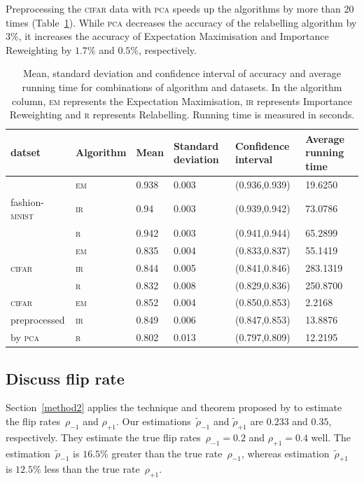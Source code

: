 \documentclass[12pt]{article} %
\newcommand{\rhoo}{\rho_{+1}}
\newcommand{\rhoz}{\rho_{-1}}
\newcommand{\mnist}{fashion-\textsc{mnist}}
\begin{document}
Preprocessing the \textsc{cifar} data with \textsc{pca} speeds up the algorithms by more than 20 times (Table~\ref{tab:Meansd}). While  \textsc{pca} decreases the accuracy of the relabelling algorithm by $3\%$, it increases the accuracy of Expectation Maximisation and Importance Reweighting  by $1.7\%$ and $0.5\%$, respectively. 
\begin{table}
	\caption{Mean, standard deviation and confidence interval of accuracy and average running time for combinations of algorithm and datasets. In the algorithm column, \textsc{em} represents the Expectation Maximisation, \textsc{ir} represents Importance Reweighting and \textsc{r} represents Relabelling. Running time is measured in seconds.}
	\label{tab:Meansd}
\centering
\begin{tabular}{@{}llllll@{}}
\toprule
datset& Algorithm&Mean  & Standard deviation & Confidence interval & Average running time \\ \midrule
&\textsc{em}&0.938 & 0.003              & (0.936,0.939)     & 19.6250\\
\mnist\ &\textsc{ir}&0.94  & 0.003              & (0.939,0.942)     & 73.0786\\
&\textsc{r}&0.942 & 0.003              & (0.941,0.944)     & 65.2899\\
\midrule
&\textsc{em}&0.835 & 0.004              & (0.833,0.837)     & 55.1419\\
\textsc{cifar}&\textsc{ir}&0.844 & 0.005              & (0.841,0.846)     & 283.1319\\
  &\textsc{r}&0.832 & 0.008              & (0.829,0.836)     & 250.8700\\ 
\midrule
\textsc{cifar}&\textsc{em}&0.852 & 0.004              & (0.850,0.853)     & 2.2168\\
 preprocessed&\textsc{ir}& 0.849 & 0.006              & (0.847,0.853)     & 13.8876\\
 by \textsc{pca}  &\textsc{r}& 0.802 & 0.013              & (0.797,0.809)     & 12.2195\\ 
\bottomrule
\end{tabular}
\end{table}



\subsection{Discuss flip rate}

Section~\ref{method2} applies the technique and theorem proposed by \citet{liu2016classification} to estimate the flip rates~$\rhoz$ and $\rhoo$. Our estimations~$\tilde{\rho}_{-1}$ and $\tilde{\rho}_{+1}$ are $0.233$ and $0.35$, respectively. They estimate the true flip rates~$\rhoz=0.2$ and $\rhoo=0.4$ well. 
The estimation~$\tilde{\rho}_{-1}$ is $16.5\%$ greater than the true rate~$\rhoz$, whereas estimation~$\tilde{\rho}_{+1}$ is $12.5\%$ less than  the true rate~$\rhoo$.
\end{document}
